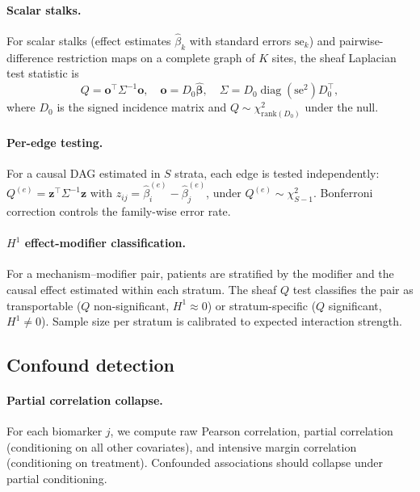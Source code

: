\documentclass[11pt]{article}
\begin{document}
\paragraph{Scalar stalks.}
For scalar stalks (effect estimates $\hat\beta_k$ with standard errors $\mathrm{se}_k$) and pairwise-difference restriction maps on a complete graph of $K$ sites, the sheaf Laplacian test statistic is
\begin{equation}
    Q = \mathbf{o}^\top \Sigma^{-1} \mathbf{o}, \quad
    \mathbf{o} = D_0 \boldsymbol{\hat\beta}, \quad
    \Sigma = D_0 \operatorname{diag}(\mathrm{se}^2) D_0^\top,
    \label{eq:sheaf-Q}
\end{equation}
where $D_0$ is the signed incidence matrix and $Q \sim \chi^2_{\mathrm{rank}(D_0)}$ under the null.

\paragraph{Per-edge testing.}
For a causal DAG estimated in $S$ strata, each edge is tested independently:
$Q^{(e)} = \mathbf{z}^\top \Sigma^{-1} \mathbf{z}$ with $z_{ij} = \hat\beta_i^{(e)} - \hat\beta_j^{(e)}$, under $Q^{(e)} \sim \chi^2_{S-1}$.
Bonferroni correction controls the family-wise error rate.

\paragraph{$H^1$ effect-modifier classification.}
For a mechanism--modifier pair, patients are stratified by the modifier and the causal effect estimated within each stratum.
The sheaf $Q$ test classifies the pair as transportable ($Q$ non-significant, $H^1 \approx 0$) or stratum-specific ($Q$ significant, $H^1 \neq 0$).
Sample size per stratum is calibrated to expected interaction strength.

\subsection{Confound detection}
\label{sec:meth-confound}

\paragraph{Partial correlation collapse.}
For each biomarker $j$, we compute raw Pearson correlation, partial correlation (conditioning on all other covariates), and intensive margin correlation (conditioning on treatment).
Confounded associations should collapse under partial conditioning.
\end{document}
